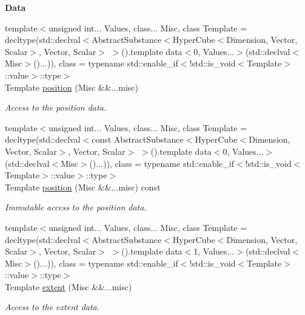 \begin{Indent}{\bf Data}\par
\begin{DoxyCompactItemize}
\item 
{\footnotesize template$<$unsigned int... Values, class... Misc, class Template  = decltype(std\-::declval$<$\-Abstract\-Substance$<$\-Hyper\-Cube$<$\-Dimension, Vector, Scalar$>$, Vector, Scalar$>$ $>$().\-template data$<$0, Values...$>$(std\-::declval$<$\-Misc$>$()...)), class  = typename std\-::enable\-\_\-if$<$!std\-::is\-\_\-void$<$\-Template$>$\-::value$>$\-::type$>$ }\\Template \hyperlink{exceptionmagrathea_1_1HyperCube_a2c7b0b6944e74adf993e43b6c915780a}{position} (Misc \&\&...misc)
\begin{DoxyCompactList}\small\item\em Access to the position data. \end{DoxyCompactList}\item 
{\footnotesize template$<$unsigned int... Values, class... Misc, class Template  = decltype(std\-::declval$<$const Abstract\-Substance$<$\-Hyper\-Cube$<$\-Dimension, Vector, Scalar$>$, Vector, Scalar$>$ $>$().\-template data$<$0, Values...$>$(std\-::declval$<$\-Misc$>$()...)), class  = typename std\-::enable\-\_\-if$<$!std\-::is\-\_\-void$<$\-Template$>$\-::value$>$\-::type$>$ }\\Template \hyperlink{exceptionmagrathea_1_1HyperCube_a6f00ee8b1af6757ab600abeea90cf745}{position} (Misc \&\&...misc) const 
\begin{DoxyCompactList}\small\item\em Immutable access to the position data. \end{DoxyCompactList}\item 
{\footnotesize template$<$unsigned int... Values, class... Misc, class Template  = decltype(std\-::declval$<$\-Abstract\-Substance$<$\-Hyper\-Cube$<$\-Dimension, Vector, Scalar$>$, Vector, Scalar$>$ $>$().\-template data$<$1, Values...$>$(std\-::declval$<$\-Misc$>$()...)), class  = typename std\-::enable\-\_\-if$<$!std\-::is\-\_\-void$<$\-Template$>$\-::value$>$\-::type$>$ }\\Template \hyperlink{exceptionmagrathea_1_1HyperCube_aa37dca86c65f23784caa3f856637816c}{extent} (Misc \&\&...misc)
\begin{DoxyCompactList}\small\item\em Access to the extent data. \end{DoxyCompactList}\item 

\end{DoxyCompactItemize}
\end{Indent}
